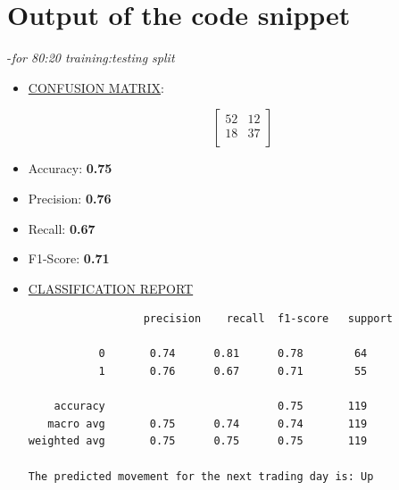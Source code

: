 \documentclass[12pt,a4paper]{report}
\begin{document}
\section{Output of the code snippet}-\textit{for 80:20 training:testing split}
\begin{itemize}
    \item \underline{CONFUSION MATRIX}:
    \vspace{-0.5cm}
    \begin{flushleft}
    \[
    \begin{bmatrix}
        52 & 12 \\
        18 & 37 \\
    \end{bmatrix}
    \]
    \end{flushleft}
    \vspace{-0.5cm}

    \item Accuracy: \textbf{0.75}
    \item Precision: \textbf{0.76}
    \item Recall: \textbf{0.67}
    \item F1-Score: \textbf{0.71}
\newpage
    \item \underline{CLASSIFICATION REPORT}
\begin{verbatim}
                  precision    recall  f1-score   support

           0       0.74      0.81      0.78        64
           1       0.76      0.67      0.71        55

    accuracy                           0.75       119
   macro avg       0.75      0.74      0.74       119
weighted avg       0.75      0.75      0.75       119

The predicted movement for the next trading day is: Up
\end{verbatim}
\end{itemize}
\end{document}
